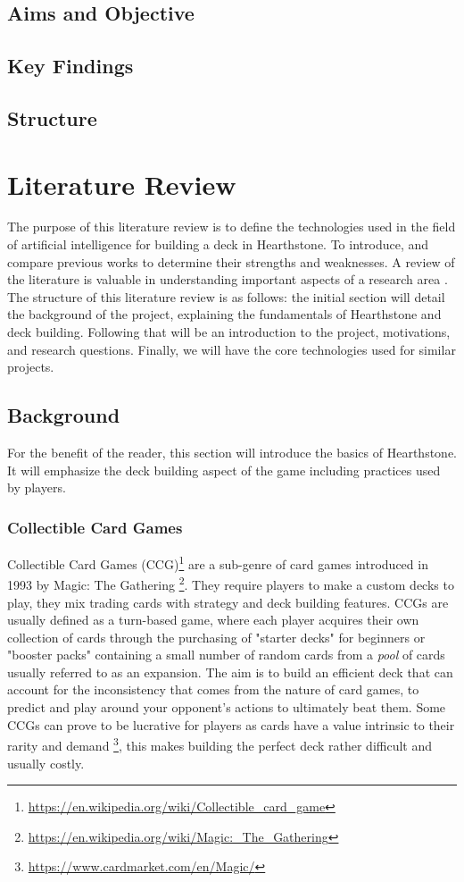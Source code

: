 \documentclass{report} %
\begin{document}
\section{Aims and Objective}

\section{Key Findings}
\section{Structure}

\chapter{Literature Review}
The purpose of this literature review is to define the technologies used in the field of artificial intelligence for building a deck in Hearthstone. To introduce, and compare previous works to determine their strengths and weaknesses. A review of the literature is valuable in understanding important aspects of a research area \cite{Isaacs2020}. The structure of this literature review is as follows: the initial section will detail the background of the project, explaining the fundamentals of Hearthstone and deck building. Following that will be an introduction to the project,  motivations, and research questions. Finally, we will have the core technologies used for similar projects.
\section{Background}
	For the benefit of the reader, this section will introduce the basics of Hearthstone. It will emphasize the deck building aspect of the game including practices used by players.  
\subsection{Collectible Card Games}
	Collectible Card Games (CCG)\footnote{\url{https://en.wikipedia.org/wiki/Collectible_card_game}} are a sub-genre of card games introduced in 1993 by Magic: The Gathering \footnote{\url{https://en.wikipedia.org/wiki/Magic:_The_Gathering}}. They require players to make a custom decks to play, they mix trading cards with strategy and deck building features. CCGs are usually defined as a turn-based game, where each player acquires their own collection of cards through the purchasing of "starter decks" for beginners or "booster packs" containing a small number of random cards from a {\it{pool}} of cards usually referred to as an expansion. The aim is to build an efficient deck that can account for the inconsistency that comes from the nature of card games, to predict and play around your opponent's actions to ultimately beat them. Some CCGs can prove to be lucrative for players as cards have a value intrinsic to their rarity and demand \footnote{\url{https://www.cardmarket.com/en/Magic/}}, this makes building the perfect deck rather difficult and usually costly.
\end{document}
